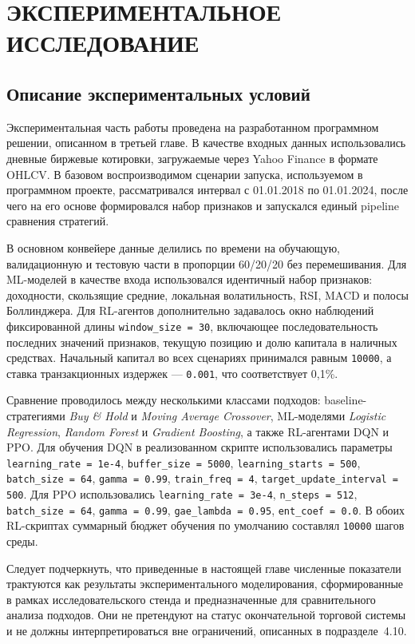 \clearpage
\section{ЭКСПЕРИМЕНТАЛЬНОЕ ИССЛЕДОВАНИЕ}

\subsection{Описание экспериментальных условий}

Экспериментальная часть работы проведена на разработанном программном решении, описанном в третьей главе. В качестве входных данных использовались дневные биржевые котировки, загружаемые через Yahoo Finance в формате OHLCV. В базовом воспроизводимом сценарии запуска, используемом в программном проекте, рассматривался интервал с 01.01.2018 по 01.01.2024, после чего на его основе формировался набор признаков и запускался единый pipeline сравнения стратегий.

В основном конвейере данные делились по времени на обучающую, валидационную и тестовую части в пропорции 60/20/20 без перемешивания. Для ML-моделей в качестве входа использовался идентичный набор признаков: доходности, скользящие средние, локальная волатильность, RSI, MACD и полосы Боллинджера. Для RL-агентов дополнительно задавалось окно наблюдений фиксированной длины \texttt{window\_size = 30}, включающее последовательность последних значений признаков, текущую позицию и долю капитала в наличных средствах. Начальный капитал во всех сценариях принимался равным \texttt{10000}, а ставка транзакционных издержек --- \texttt{0.001}, что соответствует 0{,}1\%.

Сравнение проводилось между несколькими классами подходов: baseline-стратегиями \textit{Buy \& Hold} и \textit{Moving Average Crossover}, ML-моделями \textit{Logistic Regression}, \textit{Random Forest} и \textit{Gradient Boosting}, а также RL-агентами DQN и PPO. Для обучения DQN в реализованном скрипте использовались параметры \texttt{learning\_rate = 1e-4}, \texttt{buffer\_size = 5000}, \texttt{learning\_starts = 500}, \texttt{batch\_size = 64}, \texttt{gamma = 0.99}, \texttt{train\_freq = 4}, \texttt{target\_update\_interval = 500}. Для PPO использовались \texttt{learning\_rate = 3e-4}, \texttt{n\_steps = 512}, \texttt{batch\_size = 64}, \texttt{gamma = 0.99}, \texttt{gae\_lambda = 0.95}, \texttt{ent\_coef = 0.0}. В обоих RL-скриптах суммарный бюджет обучения по умолчанию составлял \texttt{10000} шагов среды.

Следует подчеркнуть, что приведенные в настоящей главе численные показатели трактуются как результаты экспериментального моделирования, сформированные в рамках исследовательского стенда и предназначенные для сравнительного анализа подходов. Они не претендуют на статус окончательной торговой системы и не должны интерпретироваться вне ограничений, описанных в подразделе~4.10.

